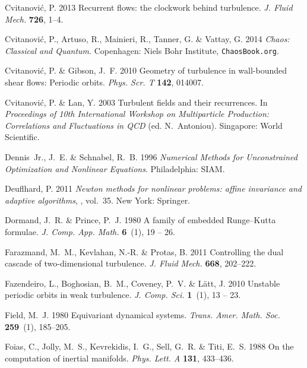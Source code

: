 \documentclass{jfm}
\begin{document}
\begin{thebibliography}{68}
{\sc Cvitanovi{\'c}, P.} 2013 Recurrent flows: the clockwork behind turbulence.
  {\em J. Fluid Mech.\/} {\bf 726}, 1--4.

{\sc Cvitanovi\'{c}, P., Artuso, R., Mainieri, R., Tanner, G. \& Vattay, G.}
  2014 {\em Chaos: Classical and Quantum\/}. Copenhagen: Niels Bohr Institute,
  {\tt ChaosBook.org}.

{\sc Cvitanovi{\'c}, P. \& Gibson, J.~F.} 2010 Geometry of turbulence in
  wall-bounded shear flows: {Periodic} orbits. {\em Phys. Scr. T\/} {\bf 142},
  014007.

{\sc Cvitanovi\'{c}, P. \& Lan, Y.} 2003 Turbulent fields and their
  recurrences. In {\em Proceedings of 10th International Workshop on
  Multiparticle Production: Correlations and Fluctuations in QCD\/} (ed.
  N.~Antoniou). Singapore: World Scientific.

{\sc Dennis~Jr., J.~E. \& Schnabel, R.~B.} 1996 {\em Numerical Methods for
  Unconstrained Optimization and Nonlinear Equations\/}. Philadelphia: SIAM.

{\sc Deuflhard, P.} 2011 {\em Newton methods for nonlinear problems: affine
  invariance and adaptive algorithms\/}, , vol.~35. New York: Springer.

{\sc Dormand, J.~R. \& Prince, P.~J.} 1980 A family of embedded
  {R}unge--{K}utta formulae. {\em J. Comp. App. Math.\/} {\bf 6}~(1), 19 -- 26.

{\sc Farazmand, M.~M., Kevlahan, N.-R. \& Protas, B.} 2011 Controlling the dual
  cascade of two-dimensional turbulence. {\em J. Fluid Mech.\/} {\bf 668},
  202--222.

{\sc Fazendeiro, L., Boghosian, B.~M., Coveney, P.~V. \& L{\"a}tt, J.} 2010
  Unstable periodic orbits in weak turbulence. {\em J. Comp. Sci.\/} {\bf
  1}~(1), 13 -- 23.

{\sc Field, M.~J.} 1980 Equivariant dynamical systems. {\em Trans. Amer. Math.
  Soc.\/} {\bf 259}~(1), 185--205.

{\sc Foias, C., Jolly, M.~S., Kevrekidis, I.~G., Sell, G.~R. \& Titi, E.~S.}
  1988 On the computation of inertial manifolds. {\em Phys. Lett. A\/} {\bf
  131}, 433--436.


\end{thebibliography}
\end{document}
